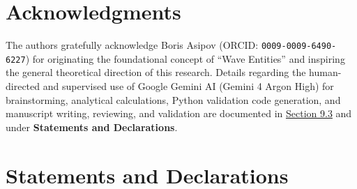 \documentclass[10pt,aps,prd,twocolumn,superscriptaddress,nofootinbib,floatfix,longbibliography,showkeys]{revtex4-2}
\begin{document}
\section*{Acknowledgments}

The authors gratefully acknowledge Boris Asipov (ORCID: \texttt{0009-0009-6490-6227}) for originating the foundational concept of ``Wave Entities'' and inspiring the general theoretical direction of this research. Details regarding the human-directed and supervised use of Google Gemini AI (Gemini 4 Argon High) for brainstorming, analytical calculations, Python validation code generation, and manuscript writing, reviewing, and validation are documented in \hyperref[sec:9.3]{Section 9.3} and under \textbf{Statements and Declarations}.



\section*{Statements and Declarations}
\end{document}
